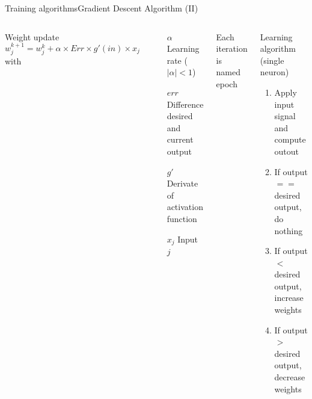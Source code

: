 \documentclass[10pt,compress]{beamer} %
\begin{document}
\begin{frame}{Training algorithms}{Gradient Descent Algorithm (II)}
	\small{
	\begin{columns}
		Weight update
		\begin{equation*}
		w_{j}^{k+1} = w_{j}^k + \alpha \times Err \times g'(in) \times x_j
		\end{equation*}
		with
		\begin{flushleft}
		\begin{itemize}
		\item[$\alpha$] Learning rate ($|\alpha|<1$)
		\item[$err$] Difference desired and current output
		\item[$g'$] Derivate of activation function
		\item[$x_j$] Input $j$
		\end{itemize}
		\end{flushleft}
		Each iteration is named \alert{epoch}
		\begin{block}{Learning algorithm (single neuron)}
		\begin{enumerate}
		\item Apply input signal and compute outout
		\item If output $==$ desired output, do nothing
		\item If output $<$ desired output, increase weights
		\item If output $>$ desired output, decrease weights
		\end{enumerate}
		\end{block}
	\end{columns}
	}
\end{frame}
\end{document}
